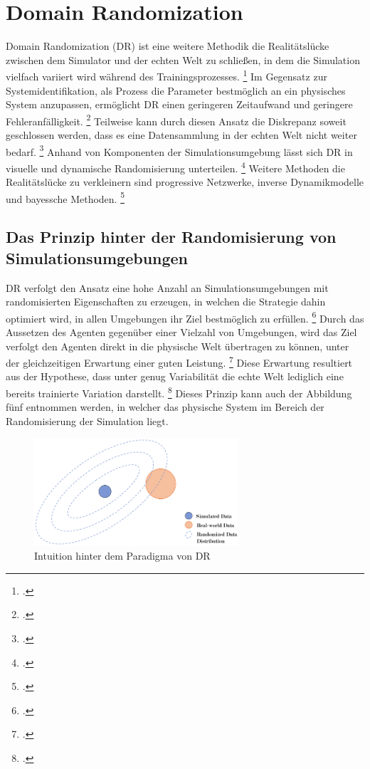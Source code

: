 \section{Domain Randomization}

Domain Randomization (DR) ist eine weitere Methodik die Realitätslücke zwischen dem Simulator und der echten Welt zu schließen, in dem die Simulation vielfach variiert wird während des Trainingsprozesses. \footcite[Vgl.][S. 3]{Bharadhwaj.2019}
Im Gegensatz zur Systemidentifikation, als Prozess die Parameter bestmöglich an ein physisches System anzupassen, ermöglicht DR einen geringeren Zeitaufwand und geringere Fehleranfälligkeit. \footcite[Vgl.][S. 1]{Tobin.2017}
Teilweise kann durch diesen Ansatz die Diskrepanz soweit geschlossen werden, dass es eine Datensammlung in der echten Welt nicht weiter bedarf. \footcite[Vgl.][S. 2]{Molchanov.2019}
Anhand von Komponenten der Simulationsumgebung lässt sich DR in visuelle und dynamische Randomisierung unterteilen. \footcite[Vgl.][S. 5]{Zhao.2020}
Weitere Methoden die Realitätslücke zu verkleinern sind progressive Netzwerke, inverse Dynamikmodelle und bayessche Methoden. \footcite[Vgl.][S. 2]{Chen.2021}

\subsection{Das Prinzip hinter der Randomisierung von Simulationsumgebungen}

DR verfolgt den Ansatz eine hohe Anzahl an Simulationsumgebungen mit randomisierten Eigenschaften zu erzeugen, in welchen die Strategie dahin optimiert wird, in allen Umgebungen ihr Ziel bestmöglich zu erfüllen. \footcite[Vgl.][S. 1]{Hsu.2023}
Durch das Aussetzen des Agenten gegenüber einer Vielzahl von Umgebungen, wird das Ziel verfolgt den Agenten direkt in die physische Welt übertragen zu können, unter der gleichzeitigen Erwartung einer guten Leistung. \footcite[Vgl.][S. 2]{Chen.2021}
Diese Erwartung resultiert aus der Hypothese, dass unter genug Variabilität die echte Welt lediglich eine bereits trainierte Variation darstellt. \footcite[Vgl.][S. 1]{Tobin.2017}
Dieses Prinzip kann auch der Abbildung fünf entnommen werden, in welcher das physische System im Bereich der Randomisierung der Simulation liegt. 

\begin{figure}[htb]
    \centering
    \includegraphics[height=4cm]{lib/graphics/Domain_randomization.png}
    \caption[Intuition hinter dem Paradigma von DR]{Intuition hinter dem Paradigma von DR\footnotemark}
    \label{abb:Domain_randomization}
\end{figure}

